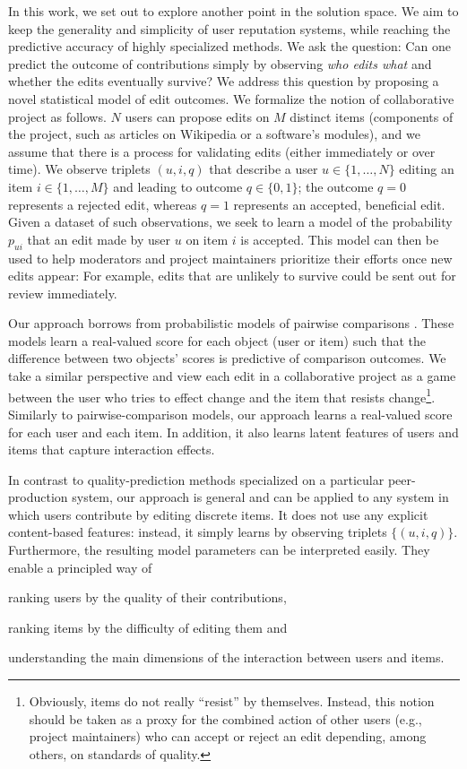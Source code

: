 In this work, we set out to explore another point in the solution space.
We aim to keep the generality and simplicity of user reputation systems, while reaching the predictive accuracy of highly specialized methods.
We ask the question:
Can one predict the outcome of contributions simply by observing \emph{who edits what} and whether the edits eventually survive?
We address this question by proposing a novel statistical model of edit outcomes.
We formalize the notion of collaborative project as follows.
$N$ users can propose edits on $M$ distinct items (components of the project, such as articles on Wikipedia or a software's modules), and we assume that there is a process for validating edits (either immediately or over time).
We observe triplets $(u, i, q)$ that describe a user $u \in \{1, \ldots, N\}$ editing an item $i \in \{1, \ldots, M\}$ and leading to outcome $q \in \{0, 1\}$;
the outcome $q = 0$ represents a rejected edit, whereas $q = 1$ represents an accepted, beneficial edit.
Given a dataset of such observations, we seek to learn a model of the probability $p_{ui}$ that an edit made by user $u$ on item $i$ is accepted.
This model can then be used to help moderators and project maintainers prioritize their efforts once new edits appear:
For example, edits that are unlikely to survive could be sent out for review immediately.

Our approach borrows from probabilistic models of pairwise comparisons \citep{zermelo1928berechnung, rasch1960probabilistic}.
These models learn a real-valued score for each object (user or item) such that the difference between two objects' scores is predictive of comparison outcomes.
We take a similar perspective and view each edit in a collaborative project as a game between the user who tries to effect change and the item that resists change\footnote{Obviously, items do not really ``resist'' by themselves.
Instead, this notion should be taken as a proxy for the combined action of other users (e.g., project maintainers) who can accept or reject an edit depending, among others, on standards of quality.}.
Similarly to pairwise-comparison models, our approach learns a real-valued score for each user and each item.
In addition, it also learns latent features of users and items that capture interaction effects.

In contrast to quality-prediction methods specialized on a particular peer-production system, our approach is general and can be applied to any system in which users contribute by editing discrete items.
It does not use any explicit content-based features: instead, it simply learns by observing triplets $\{ (u, i, q) \}$.
Furthermore, the resulting model parameters can be interpreted easily.
They enable a principled way of
\begin{enuminline}
\item ranking users by the quality of their contributions,
\item ranking items by the difficulty of editing them and
\item understanding the main dimensions of the interaction between users and items.
\end{enuminline}

